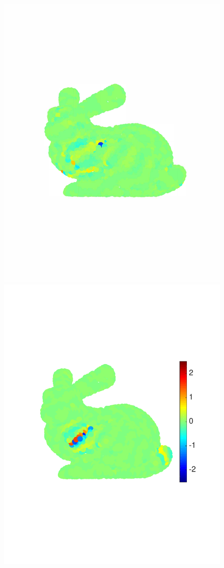 \documentclass[journal, 10pt]{IEEEtran}
\begin{document}
\begin{figure}[bth]
\begin{minipage}[m]{0.16\linewidth}
\end{minipage}
\begin{minipage}[m]{0.16\linewidth}
\centerline{\includegraphics[width=.8\linewidth]{fig_bunny_rec_wav3}}
\end{minipage}
\begin{minipage}[m]{0.16\linewidth}
\centerline{\includegraphics[width=.85\linewidth]{fig_bunny_rec_wav4}}

\end{minipage}
\end{figure}
\end{document}
